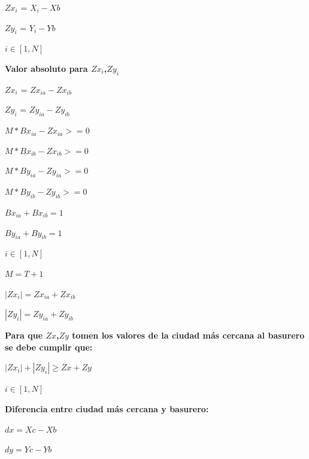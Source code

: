 \documentclass[10pt]{article}
\begin{document}
\begin{center}

 $Zx_i$ = $X_i- Xb $ 
 
  $Zy_i$ = $Y_i-Yb$ 
  
  $i \in [1,N]$
\end{center}

\textbf{Valor absoluto para  $Zx_i$,$Zy_i$ }\\

\begin{center}

 $Zx_i$ = $Zx_{ia}  - Zx_{ib}$ 
 
  $Zy_i$ = $Zy_{ia}  - Zy_{ib}$ \medskip 
  
  $M*Bx_{ia} - Zx_{ia} >= 0$
  
  $M*Bx_{ib} - Zx_{ib} >= 0$\medskip 
  
    $M*By_{ia} - Zy_{ia} >= 0$
  
  $M*By_{ib} - Zy_{ib} >= 0$\medskip 
 
  
  
  
  $ Bx_{ia} + Bx_{ib} = 1 $
  
  $ By_{ia} + By_{ib} = 1 $\medskip 
  
   $i \in [1,N]$
   
   $M=T+1$\bigskip
  
   $ |Zx_i|=Zx_{ia}  + Zx_{ib} $ 
   
   $ |Zy_i|=Zy_{ia}  +  Zy_{ib} $ 
\end{center}



\textbf{Para que  $Zx$,$Zy$  tomen los valores de la ciudad más cercana al basurero se debe cumplir que: }\\

\begin{center}

 
  $ |Zx_i| + |Zy_i| \geq Zx + Zy $
  
   
   $i \in [1,N]$
  
  

\end{center}


\textbf{Diferencia entre ciudad  m\'as cercana y basurero: }\\

\begin{center}

 
  $ dx = Xc - Xb $
  
   
   $dy = Yc - Yb$
  
  

\end{center}
\end{document}
